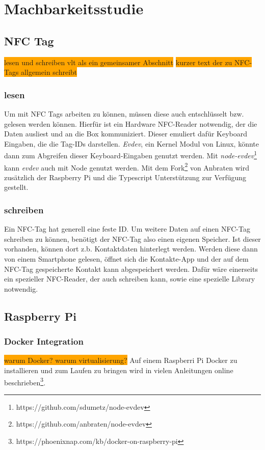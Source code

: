 \documentclass[10pt, a4paper]{article}
\begin{document}
\section{Machbarkeitsstudie}
\label{machbarkeitsstudie}

\subsection{NFC Tag}
\colorbox{orange}{lesen und schreiben vlt als ein gemeinsamer Abschnitt}
\colorbox{orange}{kurzer text der zu NFC-Tags allgemein schreibt}
\subsubsection*{lesen}
Um mit NFC Tags arbeiten zu können, müssen diese auch entschlüsselt bzw. gelesen werden können.
Hierfür ist ein Hardware NFC-Reader notwendig, der die Daten ausliest und an die Box kommuniziert.
Dieser emuliert dafür Keyboard Eingaben, die die Tag-IDs darstellen.
\textit{Evdev}, ein Kernel Modul von Linux, könnte dann zum Abgreifen dieser Keyboard-Eingaben genutzt werden. Mit \textit{node-evdev}\footnote{https://github.com/sdumetz/node-evdev} kann \textit{evdev} auch mit Node genutzt werden. Mit dem Fork\footnote{https://github.com/anbraten/node-evdev} von Anbraten wird zusätzlich der Raspberry Pi und die Typescript Unterstützung zur Verfügung gestellt.

\subsubsection*{schreiben}
Ein NFC-Tag hat generell eine feste ID.
Um weitere Daten auf einen NFC-Tag schreiben zu können, benötigt der NFC-Tag also einen eigenen Speicher.
Ist dieser vorhanden, können dort z.b. Kontaktdaten hinterlegt werden. Werden diese dann von einem Smartphone gelesen, öffnet sich die Kontakte-App und der auf dem NFC-Tag gespeicherte Kontakt kann abgespeichert werden.
Dafür wäre einerseits ein spezieller NFC-Reader, der auch schreiben kann, sowie eine spezielle Library notwendig.

\subsection{Raspberry Pi}
\subsubsection{Docker Integration}
\colorbox{orange}{warum Docker? warum virtualisierung?}
Auf einem Raspberri Pi Docker zu installieren und zum Laufen zu bringen wird in vielen Anleitungen online beschrieben\footnote{https://phoenixnap.com/kb/docker-on-raspberry-pi}.
\end{document}
